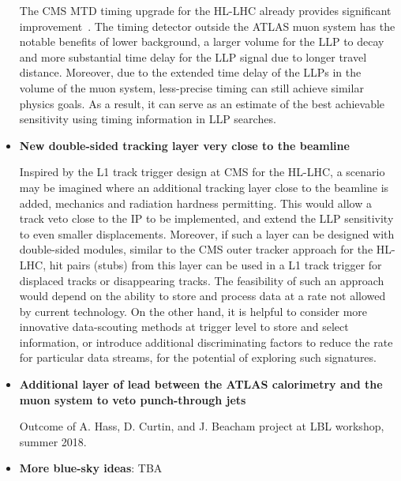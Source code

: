 \begin{itemize}
The CMS MTD timing upgrade for the HL-LHC already provides significant improvement~\cite{Liu:2018wte}. The timing detector outside the ATLAS muon system has the notable benefits of lower background, a larger volume for the LLP to decay and more substantial time delay for the LLP signal due to longer travel distance.
Moreover, due to the extended time delay of the LLPs in the volume of the muon system, less-precise timing can still achieve similar physics goals.  As a result, it can serve as an estimate of the best achievable sensitivity using timing information in LLP searches.

\item \textbf{New double-sided tracking layer very close to the beamline}

Inspired by the L1 track trigger design at CMS for the HL-LHC, a scenario may be imagined where an additional tracking layer close to the beamline is added, mechanics and radiation hardness permitting. This would allow a track veto close to the IP to be implemented, and extend the LLP sensitivity to even smaller displacements. Moreover, if such a layer can be designed with double-sided modules, similar to the CMS outer tracker approach for the HL-LHC, hit pairs (stubs) from this layer can be used in a L1 track trigger for displaced tracks or disappearing tracks. The feasibility of such an approach would depend on the ability to store and process data at a rate not allowed by current technology. On the other hand, it is helpful to consider more innovative data-scouting methods at trigger level to store and select information, or introduce additional discriminating factors to reduce the rate for particular data streams, for the potential of exploring such signatures.

\item \textbf{Additional layer of lead between the ATLAS calorimetry and the muon system to veto punch-through jets}

Outcome of A. Hass, D. Curtin, and J. Beacham project at LBL workshop, summer 2018.

\item \textbf{More blue-sky ideas}: TBA


\end{itemize}
